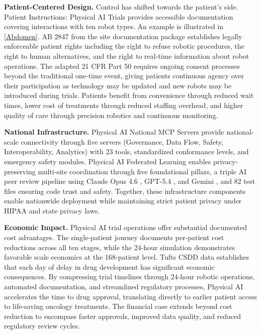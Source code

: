 \noindent\textbf{Patient-Centered Design.}
Control has shifted towards the patient's side. Patient Instructions: Physical
AI Trials \cite{patient-instructions-paper} provides accessible documentation
covering interactions with ten robot types. An example is illustrated in \autoref{Abdomen}. AB 2847 from the site documentation package establishes legally enforceable patient rights including the right to
refuse robotic procedures, the right to human alternatives, and the right to
real-time information about robot operations. The adapted 21 CFR Part 50
\cite{cfr50-adapt} requires ongoing consent processes beyond the traditional
one-time event, giving patients continuous agency over their participation as
technology may be updated and new robots may be introduced during trials.
Patients benefit from convenience through reduced wait times, lower cost of
treatments through reduced staffing overhead, and higher quality of care through
precision robotics and continuous monitoring.

\vspace{0.3cm}

\noindent\textbf{National Infrastructure.}
Physical AI National MCP Servers \cite{national-mcp-paper} provide
national-scale connectivity through five servers (Governance, Data Flow, Safety,
Interoperability, Analytics) with 23 tools, standardized conformance levels, and
emergency safety modules. Physical AI Federated Learning \cite{fl-paper}
enables privacy-preserving multi-site coordination through five foundational
pillars, a triple AI peer review pipeline using Claude Opus 4.6
\cite{claude-opus}, GPT-5.4 \cite{gpt-5-4}, and Gemini \cite{gemini}, and 82
test files ensuring code trust and safety. Together, these infrastructure
components enable nationwide deployment while maintaining strict patient privacy
under HIPAA \cite{hipaa} and state privacy laws.

\vspace{0.3cm}

\noindent\textbf{Economic Impact.}
Physical AI trial operations offer substantial documented cost advantages. The
single-patient journey documents per-patient cost reductions across all ten
stages, while the 24-hour simulation demonstrates favorable scale economics at
the 168-patient level. Tufts CSDD data \cite{tufts-delay} establishes that each
day of delay in drug development has significant economic consequences. By
compressing trial timelines through 24-hour robotic operations, automated
documentation, and streamlined regulatory processes, Physical AI accelerates the
time to drug approval, translating directly to earlier patient access to
life-saving oncology treatments. The financial case extends beyond cost
reduction to encompass faster approvals, improved data quality, and reduced
regulatory review cycles.

